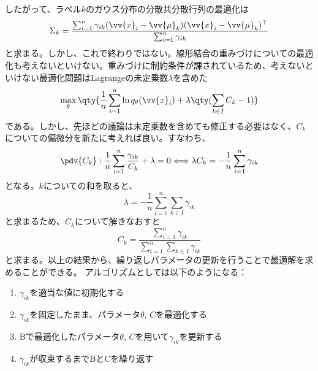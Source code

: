 \documentclass[a4paper,11pt,uplatex]{jsarticle}%
\begin{document}
したがって、ラベル$k$のガウス分布の分散共分散行列の最適化は
\begin{equation}
  \Sigma_k = \frac{\sum_{i=1}^n \gamma_{ik}(\vv{x}_i-\vv{\mu}_k)(\vv{x}_i - \vv{\mu}_k)^{\top} }{\sum_{i=1}^n \gamma_{ik}}
\end{equation}
と求まる。しかし、これで終わりではない。線形結合の重みづけについての最適化も考えないといけない。重みづけに制約条件が課されているため、考えないといけない最適化問題はLagrangeの未定乗数$\lambda$を含めた
\begin{equation}
  \max_{\theta}\qty{\frac{1}{n}\sum_{i=1}^n\ln{q_{\theta}(\vv{x}_i)} + \lambda\qty(\sum_{k\in I}C_k-1)}
\end{equation}
である。しかし、先ほどの議論は未定乗数を含めても修正する必要はなく、$C_k$についての偏微分を新たに考えれば良い。すなわち、
\begin{equation}
  \pdv{C_k}: \frac{1}{n}\sum_{i=1}^{n}\frac{\gamma_{ik}}{C_k} + \lambda = 0 \Longleftrightarrow \lambda C_k = -\frac{1}{n}\sum_{i=1}^n \gamma_{ik}
\end{equation}
となる。$k$についての和を取ると、
\begin{equation}
  \lambda = -\frac{1}{n}\sum_{i=1}^n \sum_{k\in I}\gamma_{ik}
\end{equation}
と求まるため、$C_k$について解きなおすと
\begin{equation}
  C_k = \frac{\sum_{i=1}^{n}\gamma_{ik}}{\sum_{i=1}^{n}\sum_{k\in I}\gamma_{ik}}
\end{equation}
と求まる。以上の結果から、繰り返しパラメータの更新を行うことで最適解を求めることができる。
アルゴリズムとしては以下のようになる：
\begin{enumerate}
  \item $\gamma_{ik}$を適当な値に初期化する
  \item $\gamma_{ik}$を固定したまま、パラメータ$\theta,\,C$を最適化する
  \item Bで最適化したパラメータ$\theta,\,C$を用いて$\gamma_{ik}$を更新する
  \item $\gamma_{ik}$が収束するまでBとCを繰り返す
\end{enumerate}
\end{document}
